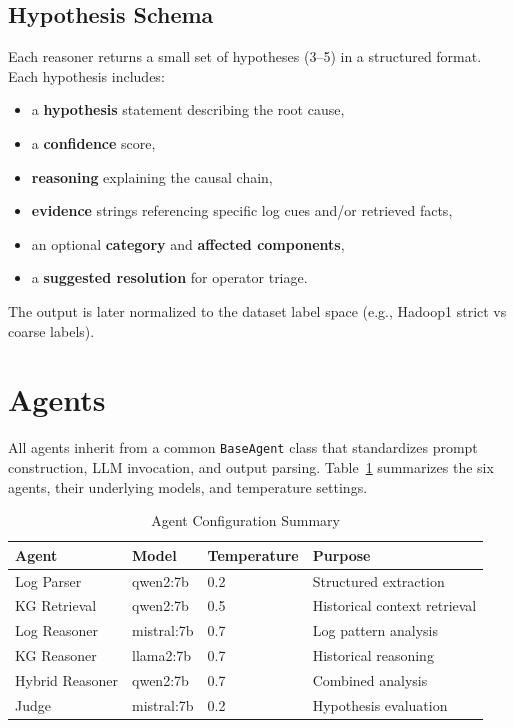 \subsection{Hypothesis Schema}
Each reasoner returns a small set of hypotheses (3--5) in a structured format. Each hypothesis
includes:
\begin{itemize}
  \item a \textbf{hypothesis} statement describing the root cause,
  \item a \textbf{confidence} score,
  \item \textbf{reasoning} explaining the causal chain,
  \item \textbf{evidence} strings referencing specific log cues and/or retrieved facts,
  \item an optional \textbf{category} and \textbf{affected components},
  \item a \textbf{suggested resolution} for operator triage.
\end{itemize}
The output is later normalized to the dataset label space (e.g., Hadoop1 strict vs coarse labels).

\section{Agents}
All agents inherit from a common \texttt{BaseAgent} class that standardizes prompt construction,
LLM invocation, and output parsing. Table~\ref{tab:agent-config} summarizes the six agents, their
underlying models, and temperature settings.

\begin{table}[H]
\centering
\caption{Agent Configuration Summary}
\label{tab:agent-config}
\begin{tabular}{llll}
\toprule
\textbf{Agent} & \textbf{Model} & \textbf{Temperature} & \textbf{Purpose} \\
\midrule
Log Parser    & qwen2:7b   & 0.2 & Structured extraction \\
KG Retrieval  & qwen2:7b   & 0.5 & Historical context retrieval \\
Log Reasoner  & mistral:7b & 0.7 & Log pattern analysis \\
KG Reasoner   & llama2:7b  & 0.7 & Historical reasoning \\
Hybrid Reasoner & qwen2:7b & 0.7 & Combined analysis \\
Judge         & mistral:7b & 0.2 & Hypothesis evaluation \\
\bottomrule
\end{tabular}
\end{table}

